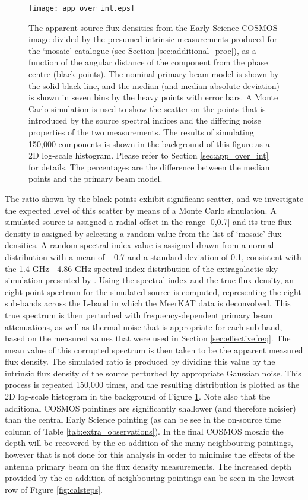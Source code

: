 \documentclass[usenatbib,usedcolumn]{mnras}
\begin{document}
\begin{figure}
 \texttt{[image: app\_over\_int.eps]}
 \caption{The apparent source flux densities from the Early Science COSMOS image divided by the presumed-intrinsic measurements produced for the `mosaic' catalogue (see Section \ref{sec:additional_proc}), as a function of the angular distance of the component from the phase centre (black points). The nominal primary beam model is shown by the solid black line, and the median (and median absolute deviation) is shown in seven bins by the heavy points with error bars. A Monte Carlo simulation is used to show the scatter on the points that is introduced by the source spectral indices and the differing noise properties of the two measurements. The results of simulating 150,000 components is shown in the background of this figure as a 2D log-scale histogram. Please refer to Section \ref{sec:app_over_int} for details. The percentages are the difference between the median points and the primary beam model.}
 \label{fig:app_over_int}
\end{figure}

The ratio shown by the black points exhibit significant scatter, and we investigate the expected level of this scatter by means of a Monte Carlo simulation. A simulated source is assigned a radial offset in the range [0,0.7] and its true flux density is assigned by selecting a random value from the list of `mosaic' flux densities. A random spectral index value is assigned drawn from a normal distribution with a mean of $-$0.7 and a standard deviation of 0.1, consistent with the 1.4 GHz - 4.86 GHz spectral index distribution of the extragalactic sky simulation presented by \citet{wilman2008}. Using the spectral index and the true flux density, an eight-point spectrum for the simulated source is computed, representing the eight sub-bands across the L-band in which the MeerKAT data is deconvolved. This true spectrum is then perturbed with frequency-dependent primary beam attenuations, as well as thermal noise that is appropriate for each sub-band, based on the measured values that were used in Section \ref{sec:effectivefreq}. The mean value of this corrupted spectrum is then taken to be the apparent measured flux density. The simulated ratio is produced by dividing this value by the intrinsic flux density of the source perturbed by appropriate Gaussian noise. This process is repeated 150,000 times, and the resulting distribution is plotted as the 2D log-scale histogram in the background of Figure \ref{fig:app_over_int}. Note also that the additional COSMOS pointings are significantly shallower (and therefore noisier) than the central Early Science pointing (as can be see in the on-source time column of Table \ref{tab:extra_observations}). In the final COSMOS mosaic the depth will be recovered by the co-addition of the many neighbouring pointings, however that is not done for this analysis in order to minimise the effects of the antenna primary beam on the flux density measurements. The increased depth provided by the co-addition of neighbouring pointings can be seen in the lowest row of Figure \ref{fig:calsteps}.
\end{document}

